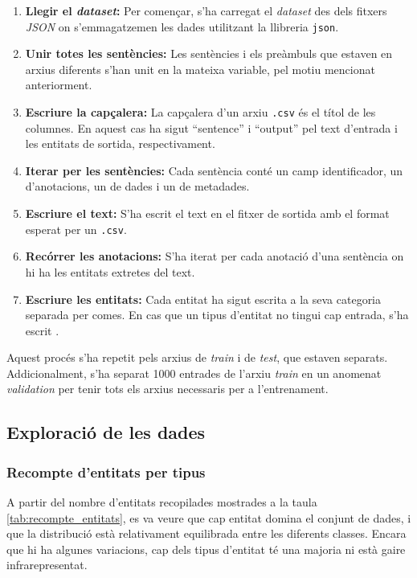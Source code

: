 \begin{enumerate}
  \item \textbf{Llegir el \textit{dataset}:} Per començar, s'ha carregat el \textit{dataset} des dels fitxers \textit{JSON} on s'emmagatzemen les dades utilitzant la llibreria \texttt{json}.
  \item \textbf{Unir totes les sentències:} Les sentències i els preàmbuls que estaven en arxius diferents s'han unit en la mateixa variable, pel motiu mencionat anteriorment.
  \item \textbf{Escriure la capçalera:} La capçalera d'un arxiu \texttt{.csv} és el títol de les columnes. En aquest cas ha sigut ``sentence'' i ``output'' pel text d'entrada i les entitats de sortida, respectivament.
  \item \textbf{Iterar per les sentències:} Cada sentència conté un camp identificador, un d'anotacions, un de dades i un de metadades.
  \item \textbf{Escriure el text:} S'ha escrit el text en el fitxer de sortida amb el format esperat per un \texttt{.csv}.
  \item \textbf{Recórrer les anotacions:} S'ha iterat per cada anotació d'una sentència on hi ha les entitats extretes del text.
  \item \textbf{Escriure les entitats:} Cada entitat ha sigut escrita a la seva categoria separada per comes. En cas que un tipus d'entitat no tingui cap entrada, s'ha escrit .
\end{enumerate}

Aquest procés s'ha repetit pels arxius de \textit{train} i de \textit{test}, que estaven separats. Addicionalment, s'ha separat 1000 entrades de l'arxiu \textit{train} en un anomenat \textit{validation} per tenir tots els arxius necessaris per a l'entrenament.



\subsection{Exploració de les dades}

\subsubsection{Recompte d'entitats per tipus}
A partir del nombre d'entitats recopilades mostrades a la taula \ref{tab:recompte_entitats}, es va veure que cap entitat domina el conjunt de dades, i que la distribució està relativament equilibrada entre les diferents classes. Encara que hi ha algunes variacions, cap dels tipus d'entitat té una majoria ni està gaire infrarepresentat.

